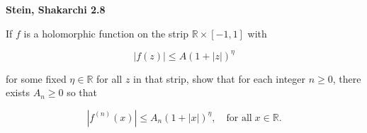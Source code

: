 \textbf{Stein, Shakarchi 2.8}

If $f$ is a holomorphic function on the strip $\mathbb{R} \times [-1, 1]$ with

$$
\left| f(z)  \right| \le A (1 + |z|)^{\eta}
$$

for some fixed $\eta \in \mathbb{R}$ for all $z$ in that strip, show that for each integer $n \ge 0$, there exists 
$A_n \ge 0$ so that 

$$
\left| f^{(n)}(x) \right| \le A_n (1 + |x|)^{\eta}, \quad \text{for all} \; x \in \mathbb{R}.
$$
